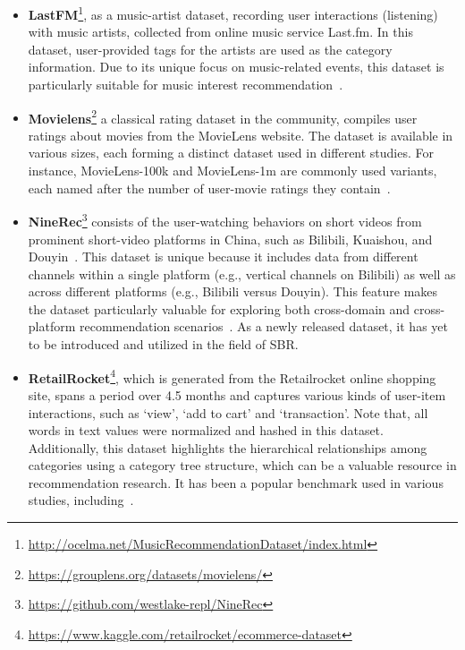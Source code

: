 \documentclass[lettersize,journal]{IEEEtran}
\begin{document}
\begin{itemize}

    \item \textbf{LastFM}\footnote{\url{http://ocelma.net/MusicRecommendationDataset/index.html}}, as a music-artist dataset, recording user interactions (listening) with music artists, collected from online music service Last.fm. In this dataset, user-provided tags for the artists are used as the category information. Due to its unique focus on music-related events, this dataset is particularly suitable for music interest recommendation~\cite{Zhou@CIKM2020,Huang@SIGIR2018,WangP@SIGIR2020,Ye@SIGIR2020}.

    \item \textbf{Movielens}\footnote{\url{https://grouplens.org/datasets/movielens/}} a classical rating dataset in the community, compiles user ratings about movies from the MovieLens website. The dataset is available in various sizes, each forming a distinct dataset used in different studies. For instance, MovieLens-100k and MovieLens-1m are commonly used variants, each named after the number of user-movie ratings they contain~\cite{liu@AAAI2021,Liu@TKDE2024,Xue@TOIS2023}.

    \item \textbf{NineRec}\footnote{\url{https://github.com/westlake-repl/NineRec}} consists of the user-watching behaviors on short videos from prominent short-video platforms in China, such as Bilibili, Kuaishou, and Douyin~\cite{NineRec}. This dataset is unique because it includes data from different channels within a single platform (e.g., vertical channels on Bilibili) as well as across different platforms (e.g., Bilibili versus Douyin). This feature makes the dataset particularly valuable for exploring both cross-domain and cross-platform recommendation scenarios~\cite{Fu@SIGIR2024,Li@ICDE2024}. As a newly released dataset, it has yet to be introduced and utilized in the field of SBR.

    \item \textbf{RetailRocket}\footnote{\url{https://www.kaggle.com/retailrocket/ecommerce-dataset}}, which is generated from the Retailrocket online shopping site, spans a period over 4.5 months and captures various kinds of user-item interactions, such as `view', `add to cart' and `transaction'. Note that, all words in text values were normalized and hashed in this dataset. Additionally, this dataset highlights the hierarchical relationships among categories using a category tree structure, which can be a valuable resource in recommendation research. It has been a popular benchmark used in various studies, including~\cite{Garg@SIGIR2019,NISER,yang@KDD2022}.


\end{itemize}
\end{document}
